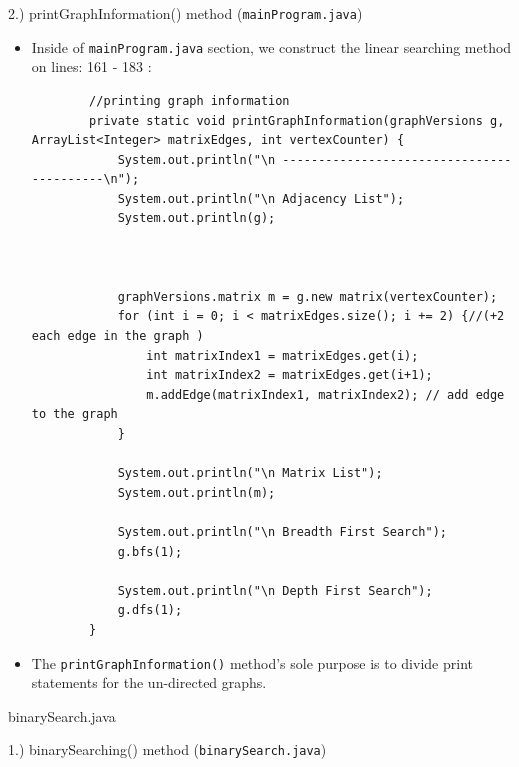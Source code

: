 \documentclass{article}
\begin{document}
\begin{large}
    2.) printGraphInformation() method (\verb|mainProgram.java|)
\end{large}


\begin{itemize}
\item Inside of \verb|mainProgram.java| section, we construct the linear searching method on lines: 161 - 183 :

\begin{verbatim}
        //printing graph information
        private static void printGraphInformation(graphVersions g, ArrayList<Integer> matrixEdges, int vertexCounter) {
            System.out.println("\n ------------------------------------------\n");
            System.out.println("\n Adjacency List");
            System.out.println(g);


        
            graphVersions.matrix m = g.new matrix(vertexCounter);
            for (int i = 0; i < matrixEdges.size(); i += 2) {//(+2 each edge in the graph )
                int matrixIndex1 = matrixEdges.get(i);
                int matrixIndex2 = matrixEdges.get(i+1);
                m.addEdge(matrixIndex1, matrixIndex2); // add edge to the graph
            }
        
            System.out.println("\n Matrix List");
            System.out.println(m);
        
            System.out.println("\n Breadth First Search");
            g.bfs(1);
        
            System.out.println("\n Depth First Search");
            g.dfs(1);
        }
\end{verbatim}
\item The \verb|printGraphInformation()| method's sole purpose is to divide print statements for the un-directed graphs. \\

\end{itemize}




\begin{center}
\begin{large}
    binarySearch.java
\end{large}
\end{center}

\begin{large}
    1.) binarySearching() method (\verb|binarySearch.java|)
\end{large}
\end{document}
